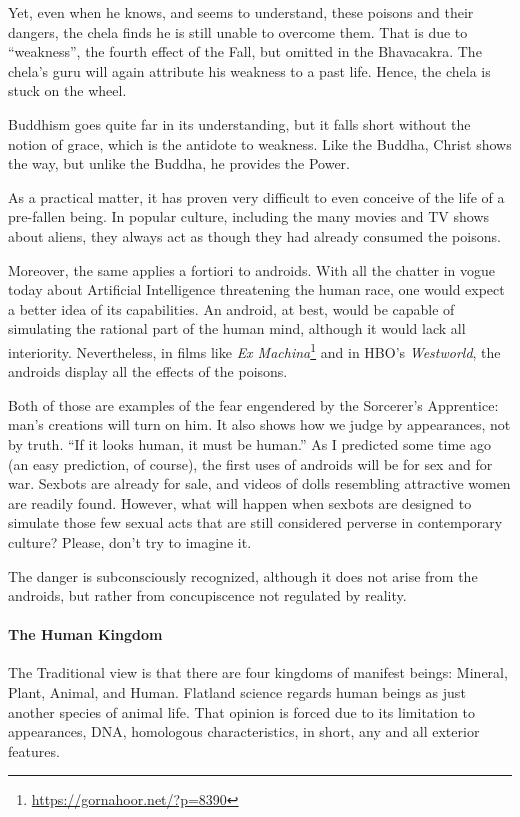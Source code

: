 Yet, even when he knows, and seems to understand, these poisons and their dangers, the chela finds he is still unable to overcome them. That is due to ``weakness'', the fourth effect of the Fall, but omitted in the Bhavacakra. The chela's guru will again attribute his weakness to a past life. Hence, the chela is stuck on the wheel.

Buddhism goes quite far in its understanding, but it falls short without the notion of grace, which is the antidote to weakness. Like the Buddha, Christ shows the way, but unlike the Buddha, he provides the Power.

As a practical matter, it has proven very difficult to even conceive of the life of a pre-fallen being. In popular culture, including the many movies and TV shows about aliens, they always act as though they had already consumed the poisons.

Moreover, the same applies a fortiori to androids. With all the chatter in vogue today about Artificial Intelligence threatening the human race, one would expect a better idea of its capabilities. An android, at best, would be capable of simulating the rational part of the human mind, although it would lack all interiority. Nevertheless, in films like \emph{Ex Machina}\footnote{\url{https://gornahoor.net/?p=8390}} and in HBO's \emph{Westworld}, the androids display all the effects of the poisons.

Both of those are examples of the fear engendered by the Sorcerer's Apprentice: man's creations will turn on him. It also shows how we judge by appearances, not by truth. ``If it looks human, it must be human.'' As I predicted some time ago (an easy prediction, of course), the first uses of androids will be for sex and for war. Sexbots are already for sale, and videos of dolls resembling attractive women are readily found. However, what will happen when sexbots are designed to simulate those few sexual acts that are still considered perverse in contemporary culture? Please, don't try to imagine it.

The danger is subconsciously recognized, although it does not arise from the androids, but rather from concupiscence not regulated by reality.

\paragraph{The Human Kingdom}


The Traditional view is that there are four kingdoms of manifest beings: Mineral, Plant, Animal, and Human. Flatland science regards human beings as just another species of animal life. That opinion is forced due to its limitation to appearances, DNA, homologous characteristics, in short, any and all exterior features.

